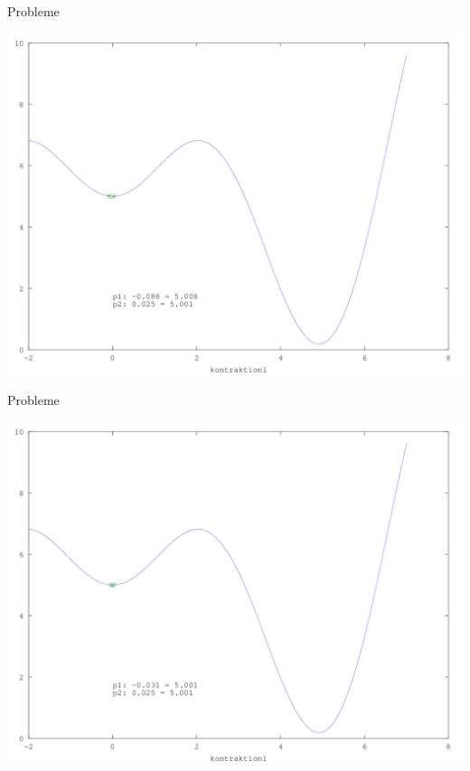 \documentclass[\outputformat]{beamer}
\begin{document}
\begin{frame}{Probleme}
	\begin{center}
		\includegraphics[height=0.75\paperheight]{../bilder/LokMinima/sinx_x007.png}
	\end{center}
\end{frame}
\begin{frame}{Probleme}
	\begin{center}
		\includegraphics[height=0.75\paperheight]{../bilder/LokMinima/sinx_x008.png}
	\end{center}
\end{frame}
\end{document}
